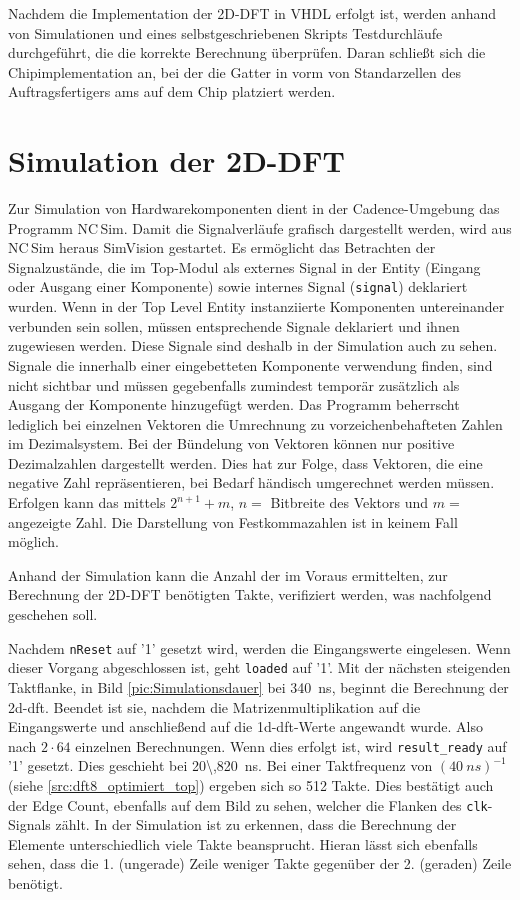 Nachdem die Implementation der 2D-DFT in VHDL erfolgt ist, werden anhand von Simulationen und eines selbstgeschriebenen Skripts Testdurchläufe durchgeführt, die die
korrekte Berechnung überprüfen.
Daran schließt sich die Chipimplementation an, bei der die Gatter in vorm von Standarzellen des Auftragsfertigers \gls{ams} auf dem Chip platziert werden.

\section{Simulation der 2D-DFT}
Zur Simulation von Hardwarekomponenten dient in der Cadence-Umgebung das Programm NC\,Sim. Damit die Signalverläufe grafisch dargestellt werden, wird aus NC\,Sim 
heraus SimVision gestartet.
Es ermöglicht das Betrachten der Signalzustände, die im Top-Modul als externes Signal in der Entity (Eingang oder Ausgang einer Komponente) sowie internes Signal 
(\texttt{signal}) deklariert wurden. Wenn in der Top Level Entity instanziierte Komponenten untereinander verbunden sein sollen, müssen entsprechende Signale 
deklariert und ihnen zugewiesen werden. Diese Signale sind deshalb in der Simulation auch zu sehen. Signale die innerhalb einer eingebetteten Komponente verwendung finden, sind 
nicht sichtbar und müssen gegebenfalls zumindest temporär zusätzlich als Ausgang der Komponente hinzugefügt werden.
Das Programm beherrscht lediglich bei einzelnen Vektoren die Umrechnung zu vorzeichenbehafteten Zahlen im Dezimalsystem.
Bei der Bündelung von Vektoren können nur positive Dezimalzahlen dargestellt werden. Dies hat zur Folge, dass Vektoren, die eine negative Zahl repräsentieren, 
bei Bedarf händisch umgerechnet werden müssen. 
Erfolgen kann das mittels $2^{n+1}+m$, $n=$ Bitbreite des Vektors und $m=$ angezeigte Zahl. Die Darstellung von Festkommazahlen ist in keinem Fall möglich.

 Anhand der Simulation kann die Anzahl der im Voraus ermittelten, zur Berechnung der 2D-DFT benötigten Takte, verifiziert werden, was nachfolgend geschehen soll.
 
 Nachdem \texttt{nReset} auf '1' gesetzt wird, werden die Eingangswerte
 eingelesen. Wenn dieser Vorgang abgeschlossen ist, geht \texttt{loaded} auf '1'. Mit der nächsten steigenden Taktflanke, in Bild \ref{pic:Simulationsdauer} bei 
 \SI{340}{ns}, beginnt die Berechnung
 der \gls{2d-dft}. Beendet ist sie, nachdem die Matrizenmultiplikation auf die Eingangswerte und anschließend auf die \gls{1d-dft}-Werte angewandt wurde. Also nach $2 \cdot 64$
 einzelnen Berechnungen. Wenn dies erfolgt ist, wird \texttt{result\_ready} auf '1' gesetzt. Dies geschieht bei \SI{20\,820}{ns}. Bei einer Taktfrequenz von $(\SI{40}{ns})^{-1}$
 (siehe \ref{src:dft8_optimiert_top}) ergeben sich so 512 Takte. Dies bestätigt auch der Edge Count, ebenfalls auf dem Bild zu sehen, welcher die Flanken des \texttt{clk}-Signals 
 zählt. In der Simulation ist zu erkennen, dass die Berechnung der Elemente 
 unterschiedlich viele Takte beansprucht. Hieran lässt sich ebenfalls sehen, dass die 1. (ungerade) Zeile weniger Takte gegenüber der 2. (geraden) Zeile benötigt. 
 
